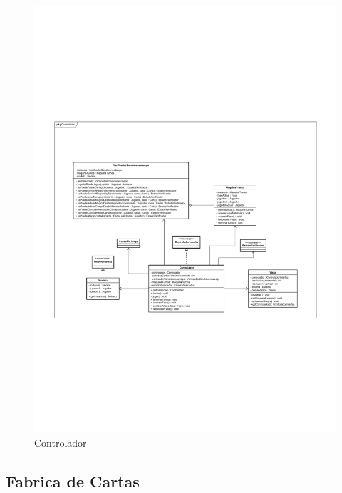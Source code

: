 \begin{figure}[H]
	\centering
	\includegraphics[scale=0.8]{includes/class_Controlador}
	\caption{Controlador}
	\label{class_Controlador}
\end{figure}

\subsection{Fabrica de Cartas}

